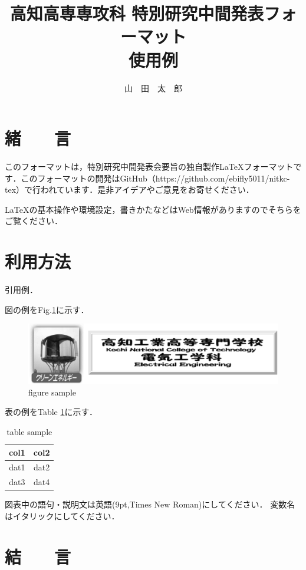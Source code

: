 \documentclass{jsarticle}
\title{高知高専専攻科 特別研究中間発表フォーマット\\使用例}
\author{山　田　太　郎}
\begin{document}
\maketitle


\section{緒　　言}
このフォーマットは，特別研究中間発表会要旨の独自製作{\LaTeX}フォーマットです．このフォーマットの開発はGitHub（https://github.com/ebifly5011/nitkc-tex）で行われています．是非アイデアやご意見をお寄せください．

{\LaTeX}の基本操作や環境設定，書きかたなどはWeb情報がありますのでそちらをご覧ください．

\section{利用方法}
引用例．

図の例をFig.\ref{fig:sample}に示す．

\begin{figure}[htbp]
\centering
\includegraphics[width=\columnwidth]{KNCT-EE.eps}
\caption{figure sample}
\label{fig:sample}
\end{figure}

表の例をTable \ref{tab:sample}に示す．

\begin{table}[htbp]
\centering
\caption{table sample}
\label{tab:sample}
\begin{tabular}{c|c}
\hline \hline
col1 & col2 \\
\hline
dat1 & dat2 \\
dat3 & dat4 \\
\hline \hline
\end{tabular}
\end{table}

図表中の語句・説明文は英語(9pt,Times New Roman)にしてください．
変数名はイタリックにしてください．
\section{結　　言}
\end{document}
